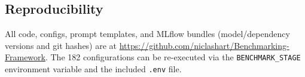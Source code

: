 \subsection{Reproducibility}

All code, configs, prompt templates, and MLflow bundles (model/dependency versions and git hashes) are at \url{https://github.com/niclashart/Benchmarking-Framework}. The 182 configurations can be re-executed via the \texttt{BENCHMARK\_STAGE} environment variable and the included \texttt{.env} file.
